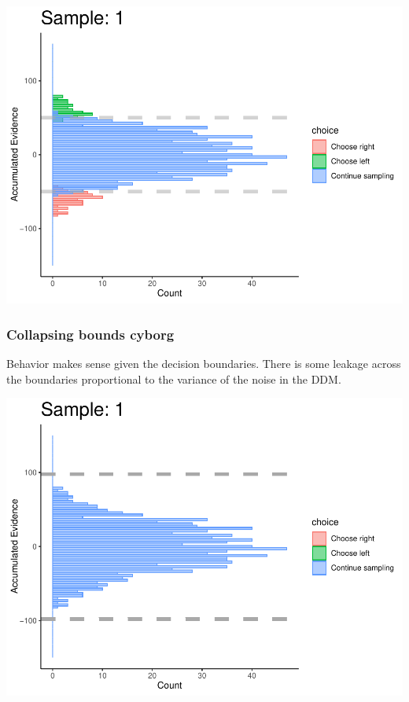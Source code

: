 \documentclass[
]{book}
\begin{document}
\begin{center}\includegraphics[width=0.8\linewidth]{LateNightBayes_files/figure-latex/fixed_check-100} \end{center}

\hypertarget{collapsing-bounds-cyborg-1}{%
\subsubsection*{Collapsing bounds cyborg}\label{collapsing-bounds-cyborg-1}}

Behavior makes sense given the decision boundaries. There is some leakage across the boundaries proportional to the variance of the noise in the DDM.

\begin{center}\includegraphics[width=0.8\linewidth]{LateNightBayes_files/figure-latex/collapsing_check-1} \end{center}
\end{document}
